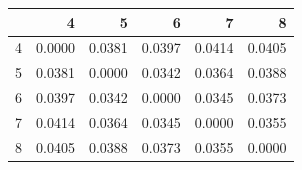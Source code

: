 \begin{tabular}{lrrrrr}
\toprule
 & 4 & 5 & 6 & 7 & 8 \\
\midrule
4 & 0.0000 & 0.0381 & 0.0397 & 0.0414 & 0.0405 \\
5 & 0.0381 & 0.0000 & 0.0342 & 0.0364 & 0.0388 \\
6 & 0.0397 & 0.0342 & 0.0000 & 0.0345 & 0.0373 \\
7 & 0.0414 & 0.0364 & 0.0345 & 0.0000 & 0.0355 \\
8 & 0.0405 & 0.0388 & 0.0373 & 0.0355 & 0.0000 \\
\bottomrule
\end{tabular}
